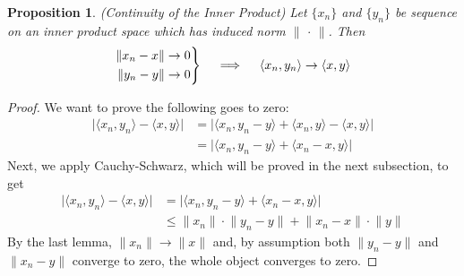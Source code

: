 \documentclass[12pt]{article}
\numberwithin{equation}{section} %
\theoremstyle{plain}
\newtheorem{prop}[thm]{Proposition}
\theoremstyle{definition}
\theoremstyle{remark}
\newcommand{\ra}{\rightarrow}
\newenvironment{rcases}
  {\left.\begin{aligned}}
  {\end{aligned}\right\rbrace}
\begin{document}
\begin{prop}\emph{(Continuity of the Inner Product)}
Let $\{x_n\}$ and $\{y_n\}$ be sequence on an inner product space which
has induced norm $\lVert\,\cdot\,\rVert$. Then
\begin{align*}
  \begin{rcases}
    \lVert x_n -x \rVert \ra 0 \\
    \lVert y_n -y \rVert \ra 0 \\
  \end{rcases}
  \quad\implies\quad
  \langle x_n, y_n\rangle
  \ra
  \langle x, y\rangle
\end{align*}
\end{prop}
\begin{proof}
We want to prove the following goes to zero:
\begin{align*}
  \big\lvert
  \langle x_n, y_n\rangle
  -
  \langle x, y\rangle
  \big\rvert
  &=
  \big\lvert
  \langle x_n, y_n-y\rangle
  + \langle x_n, y\rangle
  - \langle x, y\rangle
  \big\rvert
  \\
  &=
  \big\lvert
  \langle x_n, y_n-y\rangle
  + \langle x_n-x, y\rangle
  \big\rvert
\end{align*}
Next, we apply Cauchy-Schwarz, which will be proved in the next
subsection, to get
\begin{align*}
  \big\lvert
  \langle x_n, y_n\rangle
  -
  \langle x, y\rangle
  \big\rvert
  &=
  \big\lvert
  \langle x_n, y_n-y\rangle
  + \langle x_n-x, y\rangle
  \big\rvert
  \\
  &\leq
  \lVert x_n \rVert
  \cdot
  \lVert y_n - y\rVert
  +
  \lVert x_n -x\rVert
  \cdot
  \lVert y\rVert
\end{align*}
By the last lemma, $\lVert x_n\rVert\ra \lVert x\rVert$ and, by
assumption both $\lVert y_n - y\rVert$ and $\lVert x_n - y\rVert$
converge to zero, the whole object converges to zero.
\end{proof}
\end{document}
